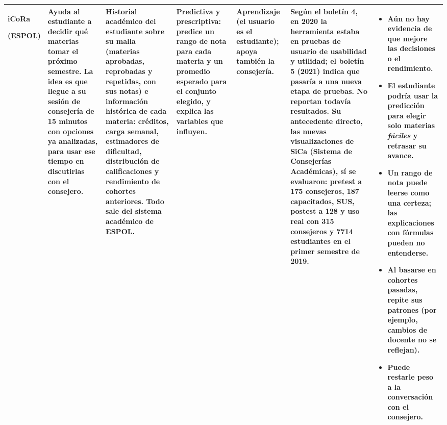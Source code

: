 \documentclass[10pt]{article}
\begin{document}
{\begin{longtable}{P{2.2cm} P{3.4cm} P{3.6cm} P{2.7cm} P{2.2cm} P{4.3cm} P{5.0cm}}
\textbf{iCoRa}\par (ESPOL)
& Ayuda al \textbf{estudiante} a decidir qué materias tomar el próximo semestre. La idea es que llegue a su sesión de consejería de 15 minutos con opciones ya analizadas, para usar ese tiempo en discutirlas con el consejero.
& Historial académico del estudiante sobre su malla (materias aprobadas, reprobadas y repetidas, con sus notas) e información histórica de cada materia: créditos, carga semanal, estimadores de dificultad, distribución de calificaciones y rendimiento de cohortes anteriores. Todo sale del sistema académico de ESPOL.
& Predictiva y prescriptiva: predice un rango de nota para cada materia y un promedio esperado para el conjunto elegido, y explica las variables que influyen.
& Aprendizaje (el usuario es el estudiante); apoya también la consejería.
& Según el boletín 4, en 2020 la herramienta estaba en pruebas de usuario de usabilidad y utilidad; el boletín 5 (2021) indica que pasaría a una nueva etapa de pruebas. No reportan todavía resultados. Su antecedente directo, las nuevas visualizaciones de SiCa (Sistema de Consejerías Académicas), sí se evaluaron: pretest a 175 consejeros, 187 capacitados, SUS, postest a 128 y uso real con 315 consejeros y 7714 estudiantes en el primer semestre de 2019.
& \begin{itemize}
\item Aún no hay evidencia de que mejore las decisiones o el rendimiento.
\item El estudiante podría usar la predicción para elegir solo materias \emph{fáciles} y retrasar su avance.
\item Un rango de nota puede leerse como una certeza; las explicaciones con fórmulas pueden no entenderse.
\item Al basarse en cohortes pasadas, repite sus patrones (por ejemplo, cambios de docente no se reflejan).
\item Puede restarle peso a la conversación con el consejero.
\end{itemize}\\
\midrule


\end{longtable}}
\end{document}
